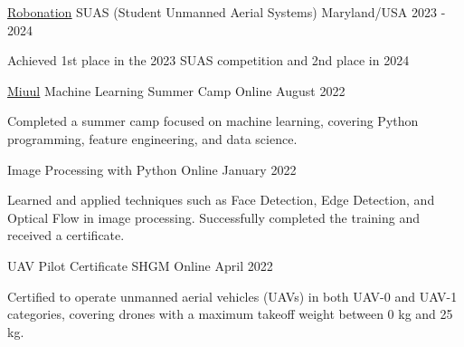 

\begin{cventries}


  \cventry
    {\href{https://robonation.org/}{\underline{Robonation}}} %
    {SUAS (Student Unmanned Aerial Systems)} %
    {Maryland/USA} %
    {2023 - 2024} %
    {
      \begin{cvitems} %
        \item {Achieved 1st place in the 2023 SUAS competition and 2nd place in 2024}
      \end{cvitems}
    }

  \cventry
    {\href{https://miuul.com/}{\underline{Miuul}}} %
    {Machine Learning Summer Camp} %
    {Online} %
    {August 2022} %
    {
      \begin{cvitems} %
        \item {Completed a summer camp focused on machine learning, covering Python programming, feature engineering, and data science.}
      \end{cvitems}
    }



  \cventry
    {\href{https://www.udemy.com/}{}} %
    {Image Processing with Python} %
    {Online} %
    {January 2022} %
    {
      \begin{cvitems} %
        \item {Learned and applied techniques such as Face Detection, Edge Detection, and Optical Flow in image processing. Successfully completed the training and received a certificate.}
      \end{cvitems}
    }



  \cventry
    {UAV Pilot Certificate} %
    {SHGM} %
    {Online} %
    {April 2022} %
    {
      \begin{cvitems} %
        \item {Certified to operate unmanned aerial vehicles (UAVs) in both UAV-0 and UAV-1 categories, covering drones with a maximum takeoff weight between 0 kg and 25 kg. }
      \end{cvitems}
    }




\end{cventries}
